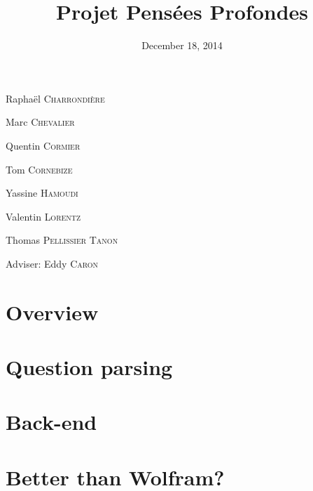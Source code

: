 \documentclass[10pt, compress]{beamer}
\title{Projet Pensées Profondes}
\subtitle{}
\date{December 18, 2014}
\institute{École Normale Supérieure de Lyon}
\begin{document}
\maketitle

\begin{frame}[fragile]
Raphaël \textsc{Charrondière}

Marc \textsc{Chevalier}

Quentin \textsc{Cormier}

Tom \textsc{Cornebize}

Yassine \textsc{Hamoudi}

Valentin \textsc{Lorentz}

Thomas \textsc{Pellissier} \textsc{Tanon}

\alert{Adviser:} Eddy \textsc{Caron}
\end{frame}



\section{Overview}


\section{Question parsing}







\section{Back-end}





\section{Better than Wolfram?}


\end{document}
